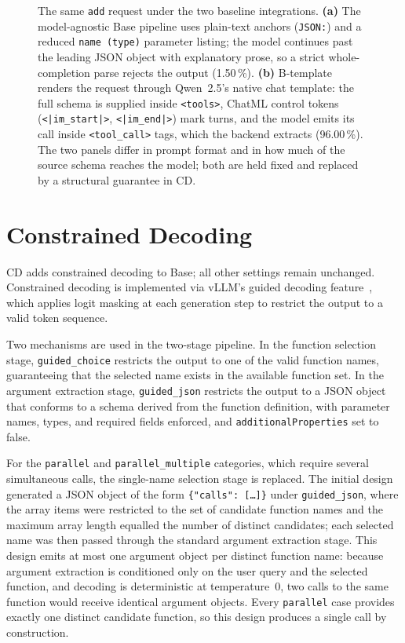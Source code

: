 \begin{figure}[ht]
\caption{The same \texttt{add} request under the two baseline integrations.
\textbf{(a)} The model-agnostic Base pipeline uses plain-text anchors
(\texttt{JSON:}) and a reduced \texttt{name (type)} parameter listing; the
model continues past the leading JSON object with explanatory prose, so a
strict whole-completion parse rejects the output (1.50\,\%). \textbf{(b)}
B-template renders the request through Qwen~2.5's native chat template: the
full schema is supplied inside \texttt{<tools>}, ChatML control tokens
(\texttt{<|im\_start|>}, \texttt{<|im\_end|>}) mark turns, and the model emits
its call inside \texttt{<tool\_call>} tags, which the backend extracts
(96.00\,\%). The two panels differ in prompt format and in how much of the
source schema reaches the model; both are held fixed and replaced by a
structural guarantee in CD.}
\label{fig:base-vs-template}
\end{figure}

\section{Constrained Decoding}

CD adds constrained decoding to Base; all other
settings remain unchanged. Constrained decoding is
implemented via vLLM's guided decoding
feature~\cite{kwon2023vllm, willard2023efficient}, which
applies logit masking at each generation step to restrict
the output to a valid token sequence.

Two mechanisms are used in the two-stage pipeline. In the
function selection stage, \texttt{guided\_choice} restricts
the output to one of the valid function names, guaranteeing
that the selected name exists in the available function
set. In the argument extraction stage, \texttt{guided\_json}
restricts the output to a JSON object that conforms to a
schema derived from the function definition, with parameter
names, types, and required fields enforced, and
\texttt{additionalProperties} set to false.

For the \texttt{parallel} and \texttt{parallel\_multiple} categories,
which require several simultaneous calls, the single-name selection
stage is replaced. The initial design generated a JSON object of the
form \texttt{\{"calls": [\dots]\}} under \texttt{guided\_json}, where the
array items were restricted to the set of candidate function names and
the maximum array length equalled the number of distinct candidates;
each selected name was then passed through the standard argument
extraction stage. This design emits at most one argument object per
distinct function name: because argument extraction is conditioned only
on the user query and the selected function, and decoding is
deterministic at temperature~0, two calls to the same function would
receive identical argument objects. Every \texttt{parallel} case
provides exactly one distinct candidate function, so this design
produces a single call by construction.

